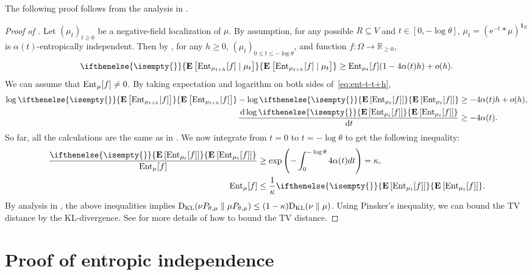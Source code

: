\documentclass[11pt,a4paper]{article}
\newcommand{\e}{\mathrm{e}}
\theoremstyle{definition}
\renewcommand{\d}{\,\-d}
\def\*#1{\mathbf{#1}} %
\def\-#1{\mathrm{#1}} %
\newcommand{\E}[2][]{ \ifthenelse{\isempty{#1}}
  {\mathbf{\mathbf{E}}\left[#2\right]}
  {\mathbf{\mathbf{E}}_{#1}\left[#2\right]} }
\begin{document}
The following proof follows from the analysis in \cite[Sec. 9]{Chen0Y23}.


\begin{proof}[Proof of ]
Let $(\mu_t)_{t\geq 0}$ be a negative-field localization of $\mu$. By assumption, for any possible $R\subseteq V$ and $t\in [0,-\log \theta]$, $\mu_t=(\e^{-t}*\mu)^{\*1_R}$ is $\alpha(t)$-entropically independent. Then by , for any $h\geq 0$, $(\mu_t)_{0\leq t\leq -\log \theta}$, and function $f:\Omega\to \mathbb{R}_{\geq 0}$,
\begin{align}\label{eq:ent-t-t+h}
    \E[]{\textnormal{Ent}_{\mu_{t+h}}[f]\mid \mu_t}\geq \textnormal{Ent}_{\mu_{t}}[f](1-4\alpha(t)h) +o(h).
\end{align}
We can assume that $\textnormal{Ent}_{\mu}[f] \neq 0$. By taking expectation and logarithm on both sides of~\eqref{eq:ent-t-t+h}, %
\begin{align*}
    \log \E[]{\textnormal{Ent}_{\mu_{t+h}}[f]}-\log \E[]{\textnormal{Ent}_{\mu_{t}}[f]}&\geq -4\alpha(t)h+o(h),\\
     \frac{\d \log \E[]{\textnormal{Ent}_{\mu_{t}}[f]}}{\d t}&\geq -4\alpha(t).
\end{align*}
So far, all the calculations are the same as in \cite{Chen0Y23}.
We now integrate from $t = 0$ to $t = -\log \theta$ to get the following inequality:
\begin{align*}
    \frac{\E[]{\textnormal{Ent}_{\mu_{t}}[f]}}{\textnormal{Ent}_{\mu}[f]}&\geq \exp\left(-\int_{0}^{-\log \theta}4\alpha(t)dt\right)=\kappa,\\
        \textnormal{Ent}_\mu[f]&\leq \frac{1}{\kappa} \E[]{\textnormal{Ent}_{\mu_{t}}[f]}.
\end{align*}
By analysis in \cite{Chen0Y23}, the above inequalities implies
$\mathrm{D}_{\textnormal{KL}}(\nu P_{\theta,\mu}\parallel \mu P_{\theta,\mu})\leq (1-\kappa)\mathrm{D}_{\textnormal{KL}}(\nu \parallel \mu)$.
Using Pinsker's inequality, we can bound the TV distance by the KL-divergence. See \cite[Sec. 9]{Chen0Y23} for more details of how to bound the TV distance.
\end{proof}


\section{Proof of entropic independence}
\end{document}
